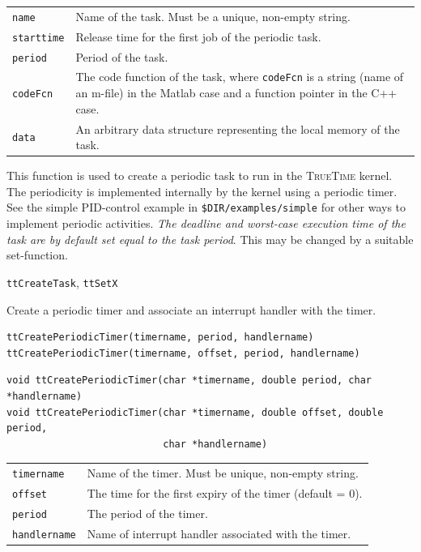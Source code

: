 \documentclass[final,twoside]{rapport}
\begin{document}
\args
\begin{tabularx}{\hsize}{l>{\raggedright\arraybackslash}X}
  {\tt name} & Name of the task. Must be a unique, non-empty string. \\
  {\tt starttime} & Release time for the first job of the periodic
  task.\\
  {\tt period} & Period of the task. \\
  {\tt codeFcn} & The code function of the task, where
  \texttt{codeFcn} is a string (name of an m-file) in the
  Matlab case and a function pointer in the C++ case. \\
  {\tt data} & An arbitrary data structure representing the local
  memory of the task.
\end{tabularx}

\descr This function is used to create a periodic task to run in the
\textsc{TrueTime} kernel. The periodicity is implemented internally by
the kernel using a periodic timer. See the simple PID-control example
in \texttt{\$DIR/examples/simple} for other ways to implement
periodic activities. {\it The deadline and worst-case execution time
  of the task are by default set equal to the task period}. This may
be changed by a suitable set-function.

\seealso 
{\tt ttCreateTask}, {\tt ttSetX}



\purpose
Create a periodic timer and associate an interrupt handler with the timer.

\Msyntax
\begin{verbatim}
ttCreatePeriodicTimer(timername, period, handlername)
ttCreatePeriodicTimer(timername, offset, period, handlername)
\end{verbatim}

\Csyntax
\begin{verbatim}
void ttCreatePeriodicTimer(char *timername, double period, char *handlername)
void ttCreatePeriodicTimer(char *timername, double offset, double period, 
                           char *handlername)
\end{verbatim}

\args
\begin{tabularx}{\hsize}{l>{\raggedright\arraybackslash}X}
  {\tt timername} & Name of the timer. Must be unique, non-empty
  string.\\
  {\tt offset} & The time for the first expiry of the timer (default =
  0). \\
  {\tt period} & The period of the timer. \\
  {\tt handlername} & Name of interrupt handler associated with the timer.
\end{tabularx}
\end{document}
